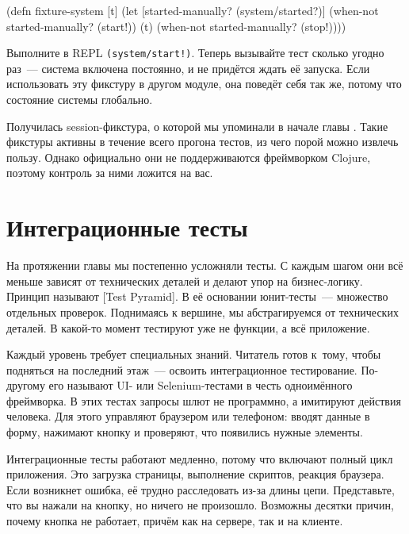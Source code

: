 \else

\begin{english}
  \begin{clojure}
(defn fixture-system [t]
  (let [started-manually? (system/started?)]
    (when-not started-manually?
      (start!))
    (t)
    (when-not started-manually?
      (stop!))))
  \end{clojure}
\end{english}

\fi

Выполните в REPL \verb|(system/start!)|. Теперь вызывайте тест сколько угодно
раз~--- система включена постоянно, и не придётся ждать её запуска. Если
использовать эту фикстуру в другом модуле, она поведёт себя так же, потому что
состояние системы глобально.

Получилась session-фикстура, о которой мы упоминали в начале
главы . Такие фикстуры активны в течение всего прогона тестов,
из чего порой можно извлечь пользу. Однако официально они не поддерживаются
фреймворком Clojure, поэтому контроль за ними ложится на вас.


\section{Интеграционные тесты}


На протяжении главы мы постепенно усложняли тесты. С каждым шагом они всё меньше
зависят от технических деталей и делают упор на бизнес-логику. Принцип называют
[Test Pyramid].
В её основании юнит-тесты~--- множество отдельных проверок. Поднимаясь к
вершине, мы абстрагируемся от технических деталей. В какой-то момент тестируют
уже не функции, а всё приложение.


Каждый уровень требует специальных знаний. Читатель готов к~тому, чтобы
подняться на последний этаж~--- освоить интеграционное тестирование. По-другому
его называют UI- или Selenium-тестами в честь одноимённого фреймворка. В этих
тестах запросы шлют не программно, а имитируют действия человека. Для этого
управляют браузером или телефоном: вводят данные в форму, нажимают кнопку и
проверяют, что появились нужные элементы.

Интеграционные тесты работают медленно, потому что включают полный цикл
приложения. Это загрузка страницы, выполнение скриптов, реакция браузера. Если
возникнет ошибка, её трудно расследовать из-за длины цепи. Представьте, что вы
нажали на кнопку, но ничего не произошло. Возможны десятки причин, почему кнопка
не работает, причём как на сервере, так и на клиенте.

